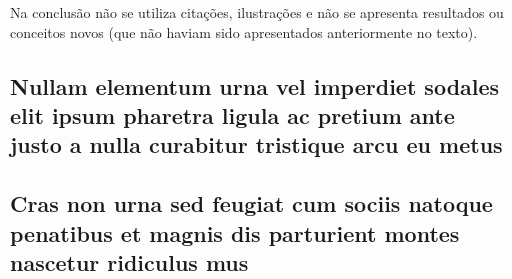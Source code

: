 \documentclass[
article,			%
11pt,				%
twoside,			%
a4paper,			%
section=TITLE,		%
onecolumn,          %
english,			%
brazil,				%
sumario=tradicional
]{abntex2}
\begin{document}
Na conclusão não se utiliza citações, ilustrações e não se apresenta resultados ou conceitos novos (que não haviam sido apresentados anteriormente no texto).

    
        
    \postextual                 %
    
    
    
    
    \vspace{1cm}
    \begin{apendicesenv}
        
        \chapter{Nullam elementum urna vel imperdiet sodales elit ipsum pharetra ligula
            ac pretium ante justo a nulla curabitur tristique arcu eu metus}
        \lipsum[55-57]
        
    \end{apendicesenv}
    
    \vspace{1cm}
    \begin{anexosenv}
        
        \chapter{Cras non urna sed feugiat cum sociis natoque penatibus et magnis dis
            parturient montes nascetur ridiculus mus}
        
        \lipsum[31]
        
    \end{anexosenv}
\end{document}
